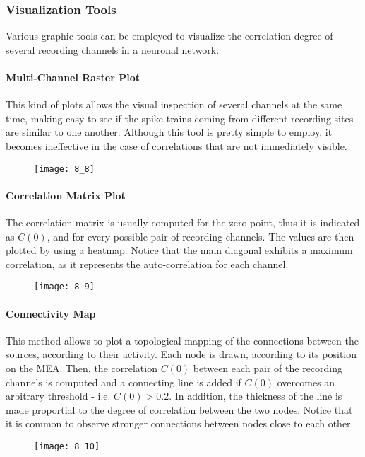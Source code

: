 \subsubsection{Visualization Tools}
Various graphic tools can be employed to visualize the correlation degree of several
recording channels in a neuronal network.
\paragraph{Multi-Channel Raster Plot} This kind of plots allows the visual inspection
of several channels at the same time, making easy to see if the spike trains coming
from different recording sites are similar to one another. Although this tool is
pretty simple to employ, it becomes ineffective in the case of correlations that are
not immediately visible.
\begin{figure}[H]
    \texttt{[image: 8\_8]}
    \centering
\end{figure}
\paragraph{Correlation Matrix Plot} The correlation matrix is usually computed for
the zero point, thus it is indicated as \(C(0)\), and for every possible pair of
recording channels. The values are then plotted by using a heatmap. Notice that the
main diagonal exhibits a maximum correlation, as it represents the auto-correlation
for each channel.
\begin{figure}[H]
    \texttt{[image: 8\_9]}
    \centering
\end{figure}
\paragraph{Connectivity Map} This method allows to plot a topological mapping of the
connections between the sources, according to their activity. Each node is drawn,
according to its position on the MEA. Then, the correlation \(C(0)\) between each pair
of the recording channels is computed and a connecting line is added if \(C(0)\)
overcomes an arbitrary threshold - i.e. \(C(0)>0.2\). In addition, the thickness of
the line is made proportial to the degree of correlation between the two nodes.
Notice that it is common to observe stronger connections between nodes close to
each other.
\begin{figure}[H]
    \texttt{[image: 8\_10]}
    \centering
\end{figure}